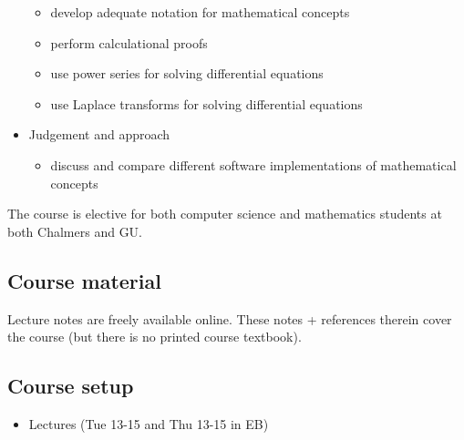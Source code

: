 \documentclass[10pt,a4paper]{article}
\begin{document}
\begin{multicols}{2}
\begin{itemize}
    \begin{itemize}
    \tightlist
    \item
      develop adequate notation for mathematical concepts
    \item
      perform calculational proofs
    \item
      use power series for solving differential equations
    \item
      use Laplace transforms for solving differential equations
    \end{itemize}
  \item
    Judgement and approach

    \begin{itemize}
    \tightlist
    \item
      discuss and compare different software implementations of
      mathematical concepts
    \end{itemize}
  \end{itemize}

  The course is elective for both computer science and mathematics
  students at both Chalmers and GU.

  \subsection{Course material}\label{course-material}

  Lecture notes are freely available online. These notes + references
  therein cover the course (but there is no printed course textbook).

  \subsection{Course setup}\label{course-setup}

  \begin{itemize}
  \tightlist
  \item
    Lectures (Tue 13-15 and Thu 13-15 in EB)


\end{itemize}
\end{multicols}
\end{document}
